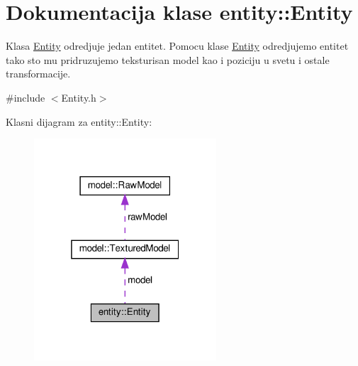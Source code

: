 \hypertarget{classentity_1_1Entity}{}\section{Dokumentacija klase entity\+:\+:Entity}
\label{classentity_1_1Entity}


Klasa \hyperlink{classentity_1_1Entity}{Entity} odredjuje jedan entitet. Pomocu klase \hyperlink{classentity_1_1Entity}{Entity} odredjujemo entitet tako sto mu pridruzujemo teksturisan model kao i poziciju u svetu i ostale transformacije.  




{\ttfamily \#include $<$Entity.\+h$>$}



Klasni dijagram za entity\+:\+:Entity\+:
\nopagebreak
\begin{figure}[H]
\begin{center}
\leavevmode
\includegraphics[width=193pt]{classentity_1_1Entity__coll__graph}
\end{center}
\end{figure}

